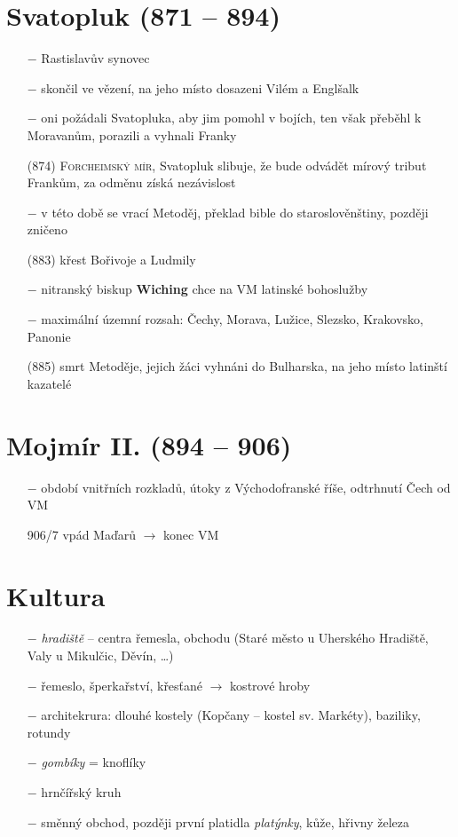 \documentclass{article}
\begin{document}
\section*{Svatopluk (871 -- 894)}
\begin{itemize}
    \vspace{-0.5em}
    \setlength\itemsep{0.15em}
    \item[$-$] Rastislavův synovec
    \item[$-$] skončil ve vězení, na jeho místo dosazeni Vilém a Englšalk
    \item[$-$] oni požádali Svatopluka, aby jim pomohl v bojích, ten však přeběhl k Moravanům, porazili a vyhnali Franky
    \item[(874)] \textsc{Forcheimský mír}, Svatopluk slibuje, že bude odvádět mírový tribut Frankům, za odměnu získá nezávislost
    \item[$-$] v této době se vrací Metoděj, překlad bible do staroslověnštiny, později zničeno
    \item[(883)] křest Bořivoje a Ludmily
    \item[$-$] nitranský biskup \textbf{Wiching} chce na VM latinské bohoslužby
    \item[$-$] maximální územní rozsah: Čechy, Morava, Lužice, Slezsko, Krakovsko, Panonie
    \item[(885)] smrt Metoděje, jejich žáci vyhnáni do Bulharska, na jeho místo latinští kazatelé
\end{itemize}

\section*{Mojmír II. (894 -- 906)}
\begin{itemize}
    \vspace{-0.5em}
    \setlength\itemsep{0.15em}
    \item[$-$] období vnitřních rozkladů, útoky z Východofranské říše, odtrhnutí Čech od VM
    \item[906/7] vpád Maďarů $\rightarrow$ konec VM
\end{itemize}

\section*{Kultura}
\begin{itemize}
    \vspace{-0.5em}
    \setlength\itemsep{0.15em}
    \item[$-$] \textit{hradiště} -- centra řemesla, obchodu (Staré město u Uherského Hradiště, Valy u Mikulčic, Děvín, \dots)
    \item[$-$] řemeslo, šperkařství, křesťané $\rightarrow$ kostrové hroby
    \item[$-$] architekrura: dlouhé kostely (Kopčany -- kostel sv. Markéty), baziliky, rotundy
    \item[$-$] \textit{gombíky} = knoflíky
    \item[$-$] hrnčířský kruh
    \item[$-$] směnný obchod, později první platidla \textit{platýnky}, kůže, hřivny železa
\end{itemize}
\end{document}
